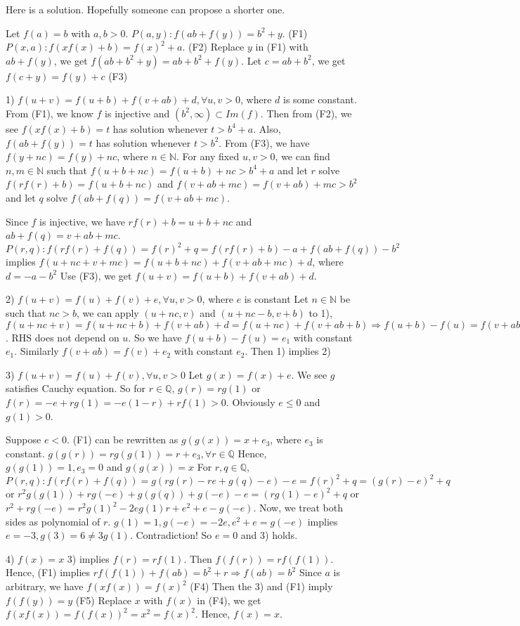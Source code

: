 \begin{solution}
	Here is a solution. Hopefully someone can propose a shorter one.

Let $ f(a)=b$ with $ a,b>0$.
$ P(a,y): f(ab+f(y))=b^2+y$. (F1)
$ P(x,a): f(xf(x)+b)=f(x)^2+a$.  (F2)
Replace $ y$ in (F1) with $ ab+f(y)$, we get
$ f(ab+b^2+y)=ab+b^2+f(y)$.
Let $ c=ab+b^2$, we get
$ f(c+y)=f(y)+c$  (F3)

1) $ f(u+v)=f(u+b)+f(v+ab)+d,\forall u,v>0$, where $ d$ is some constant.
From (F1), we know $ f$ is injective and $ (b^2,\infty)\subset Im(f)$.
Then from (F2), we see $ f(xf(x)+b)=t$ has solution whenever $ t>b^4+a$.
Also, $ f(ab+f(y))=t$ has solution whenever $ t>b^2$.
From (F3), we have $ f(y+nc)=f(y)+nc$, where $ n\in\mathbb N$.
For any fixed $ u,v>0$, we can find $ n,m\in\mathbb N$ such that
$ f(u+b+nc)=f(u+b)+nc>b^4+a$ and let $ r$ solve $ f(rf(r)+b)=f(u+b+nc)$
and
$ f(v+ab+mc)=f(v+ab)+mc>b^2$ and let $ q$ solve $ f(ab+f(q))=f(v+ab+mc)$.

Since $ f$ is injective, we have
$ rf(r)+b=u+b+nc$ and $ ab+f(q)=v+ab+mc$.
$ P(r,q): f(rf(r)+f(q))=f(r)^2+q=f(rf(r)+b)-a+f(ab+f(q))-b^2$ implies
$ f(u+nc+v+mc)=f(u+b+nc)+f(v+ab+mc)+d$, where $ d=-a-b^2$
Use (F3), we get
$ f(u+v)=f(u+b)+f(v+ab)+d$.

2) $ f(u+v)=f(u)+f(v)+e,\forall u,v>0$, where $ e$ is constant
Let $ n\in\mathbb N$ be such that $ nc>b$, we can apply $ (u+nc,v)$ and $ (u+nc-b,v+b)$ to 1),
$ f(u+nc+v)=f(u+nc+b)+f(v+ab)+d=f(u+nc)+f(v+ab+b)\Rightarrow f(u+b)-f(u)=f(v+ab+b)-f(v+ab)$.
RHS does not depend on $ u$. So we have $ f(u+b)-f(u)=e_1$ with constant $ e_1$.
Similarly $ f(v+ab)=f(v)+e_2$ with constant $ e_2$.
Then 1) implies 2)

3) $ f(u+v)=f(u)+f(v),\forall u,v>0$
Let $ g(x)=f(x)+e$. We see $ g$ satisfies Cauchy equation.
So for $ r\in\mathbb Q$, $ g(r)=rg(1)$ or $ f(r)=-e+rg(1)=-e(1-r)+rf(1)>0$.
Obviously $ e\le0$ and $ g(1)>0$. 

Suppose $ e<0$.
(F1) can be rewritten as $ g(g(x))=x+e_3$, where $ e_3$ is constant.
$ g(g(r))=rg(g(1))=r+e_3,\forall  r\in\mathbb Q$
Hence, $ g(g(1))=1,e_3=0$ and $ g(g(x))=x$
For $ r,q\in\mathbb Q$,
$ P(r,q): f(rf(r)+f(q))=g(rg(r)-re+g(q)-e)-e=f(r)^2+q=(g(r)-e)^2+q$ 
or
$ r^2g(g(1))+rg(-e)+g(g(q))+g(-e)-e=(rg(1)-e)^2+q$ 
or
$ r^2+rg(-e)=r^2g(1)^2-2eg(1)r+e^2+e-g(-e)$.
Now, we treat both sides as polynomial of $ r$.
$ g(1)=1,g(-e)=-2e,e^2+e=g(-e)$ implies
$ e=-3,g(3)=6\ne 3g(1)$. Contradiction! So $ e=0$ and 3) holds.

4) $ f(x)=x$
3) implies $ f(r)=rf(1)$. Then $ f(f(r))=rf(f(1))$.
Hence, (F1) implies $ rf(f(1))+f(ab)=b^2+r\Rightarrow f(ab)=b^2$
Since $ a$ is arbitrary, we have 
$ f(xf(x))=f(x)^2$ (F4)
Then the 3) and (F1) imply $ f(f(y))=y$ (F5)
Replace $ x$ with $ f(x)$ in (F4), we get
$ f(xf(x))=f(f(x))^2=x^2=f(x)^2$.
Hence, $ f(x)=x$.
\end{solution}



